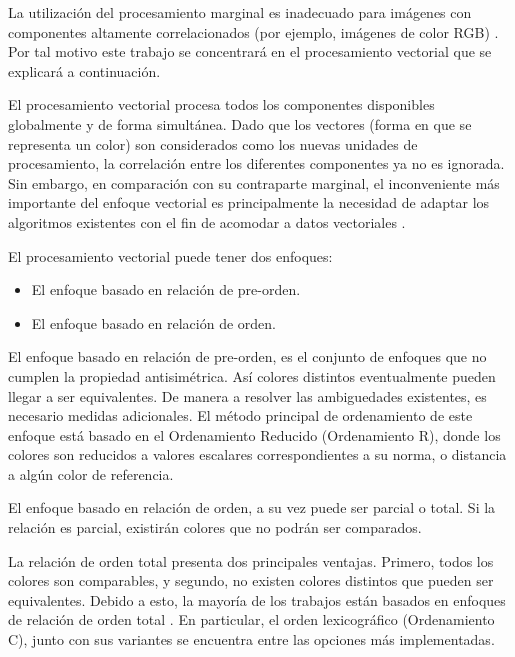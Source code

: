 La utilizaci\'on del procesamiento marginal es inadecuado para im\'agenes con componentes altamente correlacionados (por ejemplo, im\'agenes de color RGB) \cite{astola1990vector}. Por tal motivo este trabajo se concentrar\'a en el procesamiento vectorial que se explicar\'a a continuaci\'on. 


El procesamiento vectorial procesa todos los componentes disponibles globalmente y de forma simult\'anea.
Dado que los vectores (forma en que se representa un color) son considerados como los nuevas unidades de procesamiento, la correlaci\'on entre los diferentes componentes ya no es ignorada. Sin embargo, en comparaci\'on con su contraparte marginal, el inconveniente m\'as importante del enfoque vectorial es principalmente la necesidad de adaptar los algoritmos existentes con el fin de acomodar a datos vectoriales \cite{aptoula2007comparative}. 


El procesamiento vectorial puede tener dos enfoques:
 
\begin{itemize}
    \item El enfoque basado en relaci\'on de pre-orden.
    \item El enfoque basado en relaci\'on de orden.
\end{itemize}

El enfoque basado en relaci\'on de pre-orden, es el conjunto de enfoques que no cumplen la propiedad antisim\'etrica.  As\'i colores distintos eventualmente pueden llegar a ser equivalentes. De manera a resolver las ambiguedades existentes, es necesario medidas adicionales. El m\'etodo principal de ordenamiento de este enfoque est\'a basado en el Ordenamiento Reducido (Ordenamiento R), donde los colores son reducidos a valores escalares correspondientes a su norma, o distancia a alg\'un color de referencia. 


El enfoque basado en relaci\'on de orden, a su vez puede ser parcial o total. Si la relaci\'on es parcial, existir\'an colores que no podr\'an ser comparados. 

La relaci\'on de orden total presenta dos principales ventajas. Primero, todos los colores son comparables, y segundo, no existen colores distintos que pueden ser equivalentes. Debido a esto, la mayor\'ia de los trabajos est\'an basados en enfoques de relaci\'on de orden total \cite{aptoula2007comparative}. En particular, el orden lexicogr\'afico (Ordenamiento C), junto con sus variantes se encuentra entre las opciones m\'as implementadas.  
 


